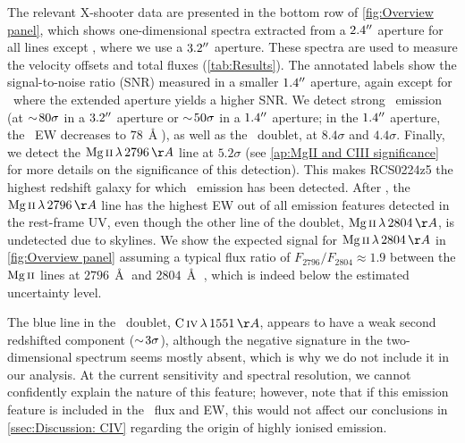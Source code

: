 The relevant X-shooter data are presented in the bottom row of \cref{fig:Overview panel}, which shows one-dimensional spectra extracted from a $2.4 \hbox{$^{\prime\prime}$}$ aperture for all lines except \lya, where we use a $3.2 \hbox{$^{\prime\prime}$}$ aperture. These spectra are used to measure the velocity offsets and total fluxes (\cref{tab:Results}). The annotated labels show the signal-to-noise ratio (SNR) measured in a smaller $1.4 \hbox{$^{\prime\prime}$}$ aperture, again except for \lya\ where the extended aperture yields a higher SNR. We detect strong \lya\ emission (at $\sim \! 80 \sigma$ in a $3.2 \hbox{$^{\prime\prime}$}$ aperture or $\sim \! 50 \sigma$ in a $1.4 \hbox{$^{\prime\prime}$}$ aperture; in the $1.4 \hbox{$^{\prime\prime}$}$ aperture, the \lya\ EW decreases to $78 \, \Angstrom$), as well as the \CIV\ doublet, at $8.4 \sigma$ and $4.4 \sigma$. Finally, we detect the $\MgII \, \lambda \, 2796 \, \Angstrom$ line at $5.2 \sigma$ (see \cref{ap:MgII and CIII significance} for more details on the significance of this detection). This makes RCS0224z5 the highest redshift galaxy for which \MgII\ emission has been detected. After \lya, the $\MgII \, \lambda \, 2796 \, \Angstrom$ line has the highest EW out of all emission features detected in the rest-frame UV, even though the other line of the doublet, $\MgII \, \lambda \, 2804 \, \Angstrom$, is undetected due to skylines. We show the expected signal for $\MgII \, \lambda \, 2804 \, \Angstrom$ in \cref{fig:Overview panel} assuming a typical flux ratio of $F_{2796}/F_{2804} \approx 1.9$ between the $\MgII$ lines at $2796 \, \Angstrom$ and $2804 \, \Angstrom$ \citep[e.g.][]{2018ApJ...855...96H}, which is indeed below the estimated uncertainty level.

The blue line in the \CIV\ doublet, $\CIV \, \lambda \, 1551 \, \Angstrom$, appears to have a weak second redshifted component ($\sim \! 3 \sigma$), although the negative signature in the two-dimensional spectrum seems mostly absent, which is why we do not include it in our analysis. At the current sensitivity and spectral resolution, we cannot confidently explain the nature of this feature; however, note that if this emission feature is included in the \CIV\ flux and EW, this would not affect our conclusions in \cref{ssec:Discussion: CIV} regarding the origin of highly ionised emission.

